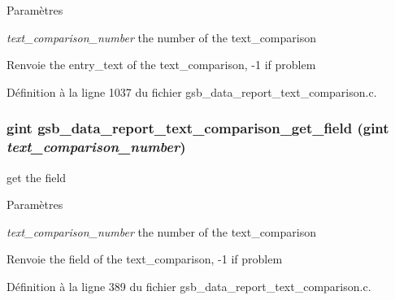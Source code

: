 \begin{DoxyParams}{Paramètres}
\item[{\em text\_\-comparison\_\-number}]the number of the text\_\-comparison\end{DoxyParams}
\begin{DoxyReturn}{Renvoie}
the entry\_\-text of the text\_\-comparison, -\/1 if problem 
\end{DoxyReturn}


Définition à la ligne 1037 du fichier gsb\_\-data\_\-report\_\-text\_\-comparison.c.

\subsubsection[{gsb\_\-data\_\-report\_\-text\_\-comparison\_\-get\_\-field}]{\setlength{\rightskip}{0pt plus 5cm}gint gsb\_\-data\_\-report\_\-text\_\-comparison\_\-get\_\-field (gint {\em text\_\-comparison\_\-number})}\label{gsb__data__report__text__comparison_8h_aa16049f62bdf58790d86880cbb500d0f}
get the field


\begin{DoxyParams}{Paramètres}
\item[{\em text\_\-comparison\_\-number}]the number of the text\_\-comparison\end{DoxyParams}
\begin{DoxyReturn}{Renvoie}
the field of the text\_\-comparison, -\/1 if problem 
\end{DoxyReturn}


Définition à la ligne 389 du fichier gsb\_\-data\_\-report\_\-text\_\-comparison.c.

